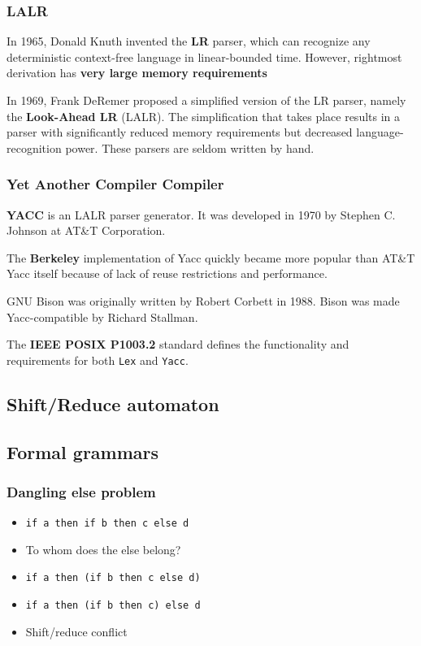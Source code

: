 \documentclass{beamer}
\begin{document}
\begin{frame}
  \frametitle{LALR}
  In 1965, Donald Knuth invented the \textbf{LR} parser, which can recognize any
  deterministic context-free language in linear-bounded time. However, rightmost
  derivation has \textbf{very large memory requirements}

  \vfill

  In 1969, Frank DeRemer proposed a simplified version of the LR parser, namely
  the \textbf{Look-Ahead LR} (LALR). The simplification that takes place results
  in a parser with significantly reduced memory requirements but decreased
  language-recognition power. These parsers are seldom written by hand.
\end{frame}

\begin{frame}
  \frametitle{Yet Another Compiler Compiler}
  \textbf{YACC} is an LALR parser generator. It was developed in 1970 by Stephen C.
  Johnson at AT\&T Corporation.

  \vfill

  The \textbf{Berkeley} implementation of Yacc quickly became more popular than
  AT\&T Yacc itself because of lack of reuse restrictions and performance.

  \vfill

  GNU Bison was originally written by Robert Corbett in 1988. Bison was made
  Yacc-compatible by Richard Stallman.

  \vfill

  The \textbf{IEEE POSIX P1003.2} standard defines the functionality and requirements for
  both \texttt{Lex} and \texttt{Yacc}.
\end{frame}

\subsection{Shift/Reduce automaton}

\subsection{Formal grammars}


\begin{frame}
  \frametitle{Dangling else problem}
    \begin{itemize}
      \item \texttt{if a then if b then c else d}
      \item To whom does the else belong?
      \item \texttt{if a then (if b then c else d)}
      \item \texttt{if a then (if b then c) else d}
      \item Shift/reduce conflict
    \end{itemize}
\end{frame}
\end{document}
